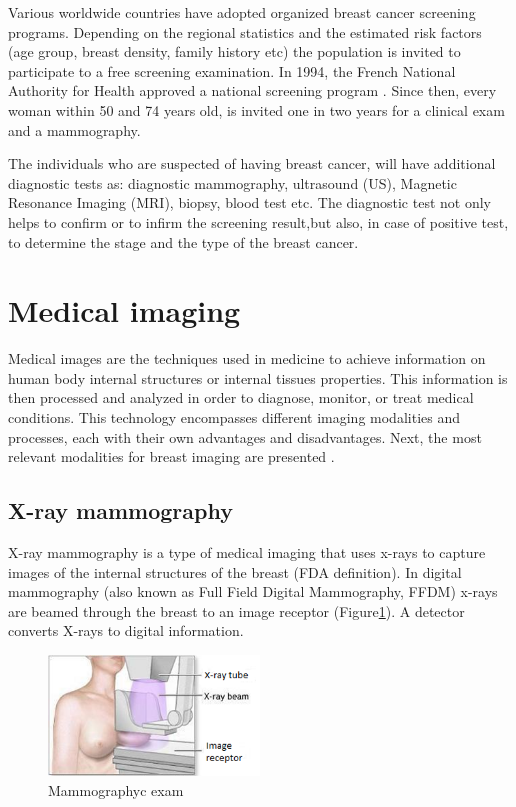 Various worldwide countries have adopted organized breast cancer screening programs. Depending on the regional statistics and the estimated risk factors (age group, breast density, family history etc) the population is invited to participate to a free screening examination. In 1994, the French National Authority for Health approved a national screening program \citep{HAS_2016}. Since then, every woman within 50 and 74 years old, is invited one in two years for a clinical exam and a mammography.

The individuals who are suspected of having breast cancer, will have additional diagnostic tests as: diagnostic mammography, ultrasound (US), Magnetic Resonance Imaging (MRI), biopsy, blood test etc. The diagnostic test  not only helps to confirm or to infirm the screening result,but also, in case of positive test,  to determine the stage and the type of the breast cancer.
\section{Medical imaging}\label{section:medicalimaging}
 
Medical images are the techniques used in medicine to achieve information on human body internal structures or internal tissues properties. This information is then processed and analyzed in order to diagnose, monitor, or treat medical conditions. This technology encompasses different imaging modalities and processes, each with their own advantages and disadvantages. Next, the most relevant modalities for breast imaging are presented .

 

\subsection{X-ray mammography}\label{subsection:mammography}

X-ray mammography is a type of medical imaging that uses x-rays to capture images of the internal structures of the breast (FDA  definition). In digital mammography (also known as Full Field Digital Mammography, FFDM) x-rays are beamed through the breast to an image receptor (Figure\ref{fig:mammographyc ecam}). A detector converts X-rays to digital information. 

	
\begin{figure}[!h]
\centering
\includegraphics[width=0.5\textwidth,keepaspectratio]{figures/xraymammo.PNG} 
\caption[Mammographyc exam]{Mammographyc exam}
\label{fig:mammographyc ecam}
\end{figure} 

